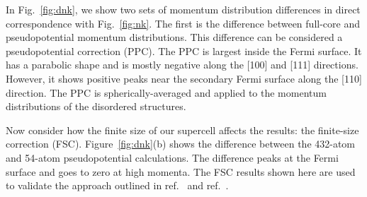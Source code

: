 \documentclass[aps,prb,showpacs,preprintnumbers,amsmath,amssymb,superscriptaddress,twocolumn]{revtex4-1}
\begin{document}
In Fig.~\ref{fig:dnk}, we show two sets of momentum distribution differences in direct correspondence with Fig.~\ref{fig:nk}. The first is the difference between full-core and pseudopotential momentum distributions. This difference can be considered a pseudopotential correction (PPC). The PPC is largest inside the Fermi surface. It has a parabolic shape and is mostly negative along the [100] and [111] directions. However, it shows positive peaks near the secondary Fermi surface along the [110] direction.  The PPC is spherically-averaged and applied to the momentum distributions of the disordered structures.

Now consider how the finite size of our supercell affects the results: the finite-size correction (FSC). Figure~\ref{fig:dnk}(b) shows the difference between the 432-atom and 54-atom pseudopotential calculations. The difference peaks at the Fermi surface and goes to zero at high momenta.  The FSC results shown here are used to validate the approach outlined in ref.~\cite{Holzmann2009} and ref.~\cite{Holzmann2011}.
\end{document}
